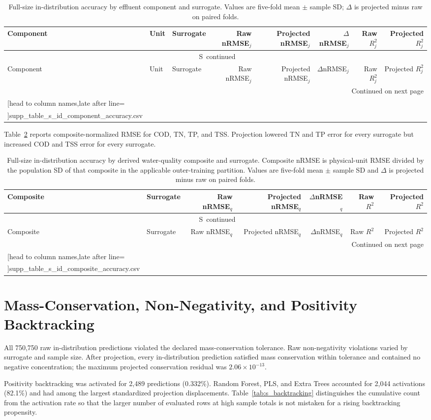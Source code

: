 \documentclass[a4paper,10pt]{article}
\newcommand{\csvrowsseven}[1]{%
  \csvreader[head to column names,late after line=\\]{#1}{}{\colA & \colB & \colC & \colD & \colE & \colF & \colG}}
\newcommand{\csvrowseight}[1]{%
  \csvreader[head to column names,late after line=\\]{#1}{}{\colA & \colB & \colC & \colD & \colE & \colF & \colG & \colH}}
\newcommand{\csvlongtable}[7]{%
  \begin{longtable}{#1}
  \caption{#2}\label{#3}\\
  \toprule
  #5 \\
  \midrule
  \endfirsthead
  \multicolumn{#4}{c}{\tablename\ \thetable\ continued}\\
  \toprule
  #5 \\
  \midrule
  \endhead
  \midrule\multicolumn{#4}{r}{Continued on next page}\\
  \endfoot
  \bottomrule
  \endlastfoot
  #7{#6}
  \end{longtable}%
}
\renewcommand{\thetable}{S\arabic{table}}
\begin{document}
\begingroup
\scriptsize
\setlength{\tabcolsep}{2.2pt}
\csvlongtable
  {llp{3.1cm}rrrrr}
  {Full-size in-distribution accuracy by effluent component and surrogate. Values are five-fold mean $\pm$ sample SD; $\Delta$ is projected minus raw on paired folds.}
  {tab:s_id_component_accuracy}
  {8}
  {Component & Unit & Surrogate & Raw nRMSE$_j$ & Projected nRMSE$_j$ & $\Delta$nRMSE$_j$ & Raw $R^2_j$ & Projected $R^2_j$}
  {supp_table_s_id_component_accuracy.csv}
  {\csvrowseight}
\endgroup

\clearpage
Table~\ref{tab:s_id_composite_accuracy} reports composite-normalized RMSE for COD, TN, TP, and TSS. Projection lowered TN and TP error for every surrogate but increased COD and TSS error for every surrogate.

\begingroup
\scriptsize
\setlength{\tabcolsep}{3pt}
\csvlongtable
  {lp{3.1cm}rrrrr}
  {Full-size in-distribution accuracy by derived water-quality composite and surrogate. Composite nRMSE is physical-unit RMSE divided by the population SD of that composite in the applicable outer-training partition. Values are five-fold mean $\pm$ sample SD and $\Delta$ is projected minus raw on paired folds.}
  {tab:s_id_composite_accuracy}
  {7}
  {Composite & Surrogate & Raw nRMSE$_q$ & Projected nRMSE$_q$ & $\Delta$nRMSE$_q$ & Raw $R^2$ & Projected $R^2$}
  {supp_table_s_id_composite_accuracy.csv}
  {\csvrowsseven}
\endgroup

\section{Mass-Conservation, Non-Negativity, and Positivity Backtracking}

All 750,750 raw in-distribution predictions violated the declared mass-conservation tolerance. Raw non-negativity violations varied by surrogate and sample size. After projection, every in-distribution prediction satisfied mass conservation within tolerance and contained no negative concentration; the maximum projected conservation residual was $2.06\times10^{-13}$.

Positivity backtracking was activated for 2,489 predictions (0.332\%). Random Forest, PLS, and Extra Trees accounted for 2,044 activations (82.1\%) and had among the largest standardized projection displacements. Table~\ref{tab:s_backtracking} distinguishes the cumulative count from the activation rate so that the larger number of evaluated rows at high sample totals is not mistaken for a rising backtracking propensity.
\end{document}
